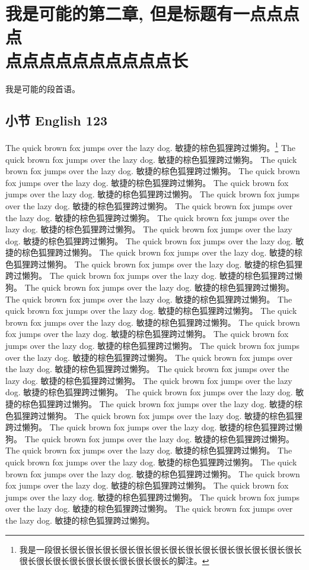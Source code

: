 \chapter{我是可能的第二章, 但是标题有一点点点点\\点点点点点点点点点点长}
\label{chap:fundamental}

我是可能的段首语。

\section{小节 English 123}
\label{sec:funda:1}

The quick brown fox jumps over the lazy dog. 敏捷的棕色狐狸跨过懒狗。\footnote{我是一段很长很长很长很长很长很长很长很长很长很长很长很长很长很长很长很长很长很长很长很长很长很长很长很长的脚注。}
The quick brown fox jumps over the lazy dog. 敏捷的棕色狐狸跨过懒狗。
The quick brown fox jumps over the lazy dog. 敏捷的棕色狐狸跨过懒狗。
The quick brown fox jumps over the lazy dog. 敏捷的棕色狐狸跨过懒狗。
The quick brown fox jumps over the lazy dog. 敏捷的棕色狐狸跨过懒狗。
The quick brown fox jumps over the lazy dog. 敏捷的棕色狐狸跨过懒狗。
The quick brown fox jumps over the lazy dog. 敏捷的棕色狐狸跨过懒狗。
The quick brown fox jumps over the lazy dog. 敏捷的棕色狐狸跨过懒狗。
The quick brown fox jumps over the lazy dog. 敏捷的棕色狐狸跨过懒狗。
The quick brown fox jumps over the lazy dog. 敏捷的棕色狐狸跨过懒狗。
The quick brown fox jumps over the lazy dog. 敏捷的棕色狐狸跨过懒狗。
The quick brown fox jumps over the lazy dog. 敏捷的棕色狐狸跨过懒狗。
The quick brown fox jumps over the lazy dog. 敏捷的棕色狐狸跨过懒狗。
The quick brown fox jumps over the lazy dog. 敏捷的棕色狐狸跨过懒狗。
The quick brown fox jumps over the lazy dog. 敏捷的棕色狐狸跨过懒狗。
The quick brown fox jumps over the lazy dog. 敏捷的棕色狐狸跨过懒狗。
The quick brown fox jumps over the lazy dog. 敏捷的棕色狐狸跨过懒狗。
The quick brown fox jumps over the lazy dog. 敏捷的棕色狐狸跨过懒狗。
The quick brown fox jumps over the lazy dog. 敏捷的棕色狐狸跨过懒狗。
The quick brown fox jumps over the lazy dog. 敏捷的棕色狐狸跨过懒狗。
The quick brown fox jumps over the lazy dog. 敏捷的棕色狐狸跨过懒狗。
The quick brown fox jumps over the lazy dog. 敏捷的棕色狐狸跨过懒狗。
The quick brown fox jumps over the lazy dog. 敏捷的棕色狐狸跨过懒狗。
The quick brown fox jumps over the lazy dog. 敏捷的棕色狐狸跨过懒狗。
The quick brown fox jumps over the lazy dog. 敏捷的棕色狐狸跨过懒狗。
The quick brown fox jumps over the lazy dog. 敏捷的棕色狐狸跨过懒狗。
The quick brown fox jumps over the lazy dog. 敏捷的棕色狐狸跨过懒狗。
The quick brown fox jumps over the lazy dog. 敏捷的棕色狐狸跨过懒狗。
The quick brown fox jumps over the lazy dog. 敏捷的棕色狐狸跨过懒狗。
The quick brown fox jumps over the lazy dog. 敏捷的棕色狐狸跨过懒狗。
The quick brown fox jumps over the lazy dog. 敏捷的棕色狐狸跨过懒狗。
The quick brown fox jumps over the lazy dog. 敏捷的棕色狐狸跨过懒狗。
The quick brown fox jumps over the lazy dog. 敏捷的棕色狐狸跨过懒狗。
The quick brown fox jumps over the lazy dog. 敏捷的棕色狐狸跨过懒狗。
The quick brown fox jumps over the lazy dog. 敏捷的棕色狐狸跨过懒狗。

